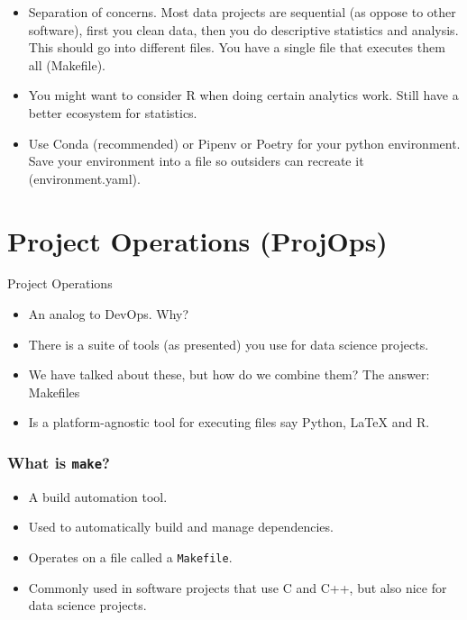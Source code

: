 \documentclass{beamer}
\begin{document}
\begin{frame}
    \begin{itemize}
    \item Separation of concerns. Most data projects are sequential (as oppose to other software), first you clean data, then you do descriptive statistics and analysis. This should go into different files. You have a single file that executes them all (Makefile).
    \item You might want to consider R when doing certain analytics work. Still have a better ecosystem for statistics.
    \item Use Conda (recommended) or Pipenv or Poetry for your python environment. Save your environment into a file so outsiders can recreate it (environment.yaml).
    \end{itemize}
\end{frame}

\section{Project Operations (ProjOps)}

\begin{frame}{Project Operations}
\begin{itemize}
    \item An analog to DevOps.
    Why?
    \item There is a suite of tools (as presented) you use for data science projects.
    \item We have talked about these, but how do we combine them? The answer: Makefiles
    \item Is a platform-agnostic tool for executing files say Python, LaTeX and R.
\end{itemize}
\end{frame}

\begin{frame}
  \frametitle{What is \texttt{make}?}
  \begin{itemize}
    \item A build automation tool.
    \item Used to automatically build and manage dependencies.
    \item Operates on a file called a \texttt{Makefile}.
    \item Commonly used in software projects that use C and C++, but also nice for data science projects.
  \end{itemize}
\end{frame}
\end{document}
